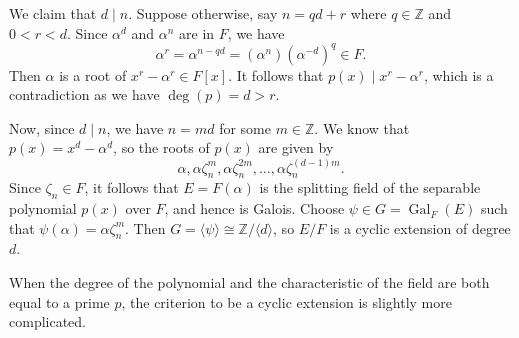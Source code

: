 \documentclass[10pt]{article}
\makeatletter
\newcommand{\Z}{\mathbb{Z}}
\DeclareMathOperator{\Gal}{Gal}
\theoremstyle{newstyle}
\newenvironment{pf}[1][\proofname]{\par
  \pushQED{\qed}%
  \normalfont \topsep0\p@\relax
  \trivlist
  \item[\hskip\labelsep\scshape
  #1\@addpunct{.}]\ignorespaces
}{%
  \popQED\endtrivlist\@endpefalse
}
\makeatother
\begin{document}
\begin{pf}
\begin{enumerate}[(1)]
    We claim that $d \mid n$. Suppose otherwise, say $n = qd + r$ where $q \in \Z$ and $0 < r < d$. 
    Since $\alpha^d$ and $\alpha^n$ are in $F$, we have 
    \[ \alpha^r = \alpha^{n-qd} = (\alpha^n)(\alpha^{-d})^q \in F. \]
    Then $\alpha$ is a root of $x^r - \alpha^r \in F[x]$. It follows that 
    $p(x) \mid x^r - \alpha^r$, which is a contradiction as we have $\deg(p) = d > r$. 
    
    Now, since $d \mid n$, we have $n = md$ for some $m \in \Z$. We know that $p(x) = x^d - \alpha^d$,
    so the roots of $p(x)$ are given by 
    \[ \alpha, \alpha\zeta_n^m, \alpha\zeta_n^{2m}, \dots, \alpha\zeta_n^{(d-1)m}. \]
    Since $\zeta_n \in F$, it follows that $E = F(\alpha)$ is the splitting field of the 
    separable polynomial $p(x)$ over $F$, and hence is Galois. Choose 
    $\psi \in G = \Gal_F(E)$ such that $\psi(\alpha) = \alpha\zeta_n^m$. Then 
    $G = \langle \psi \rangle \cong \Z/\langle d \rangle$, so $E/F$ is a cyclic extension of degree $d$. 
    \qedhere 
\end{enumerate}
\end{pf}

When the degree of the polynomial and the characteristic of the field are both equal to 
a prime $p$, the criterion to be a cyclic extension is slightly more complicated. 
\end{document}
